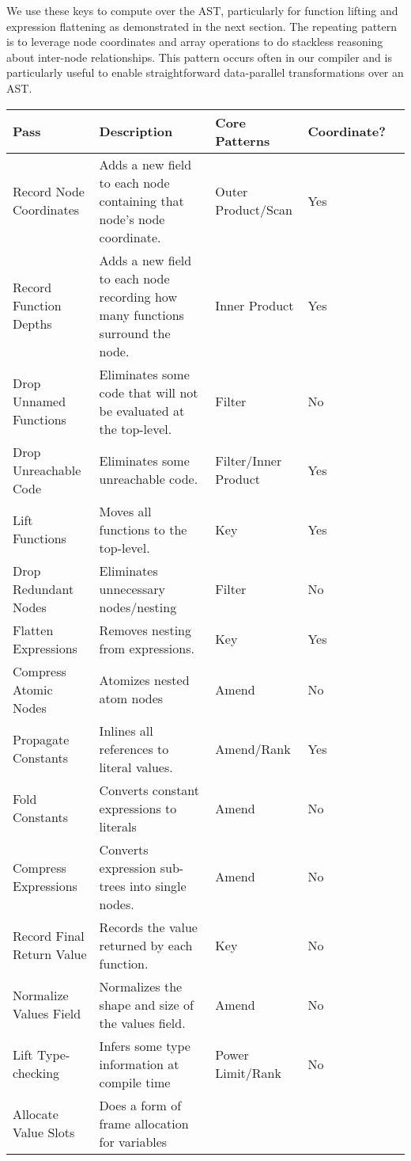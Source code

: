 \documentclass[numbers,preprint]{sigplanconf}
\begin{document}
\noindent
We use these keys to compute over the AST, particularly for function lifting 
and expression flattening as demonstrated in the next section. The repeating 
pattern is to leverage node coordinates and array operations to do stackless 
reasoning about inter-node relationships. This pattern occurs often in our 
compiler and is particularly useful to enable straightforward data-parallel 
transformations over an AST.

\begin{table*}
\centering
\begin{tabular}{l p{2.8in} l l l}
\toprule
Pass & Description & Core Patterns & Coordinate? \\
\midrule
Record Node Coordinates & Adds a new field to each node containing that node's 
 node coordinate. & Outer Product/Scan & Yes \\
Record Function Depths & Adds a new field to each node recording how many 
 functions surround the node. & Inner Product & Yes \\
Drop Unnamed Functions & Eliminates some code that will not be evaluated at 
 the top-level. & Filter & No \\
Drop Unreachable Code & Eliminates some unreachable code. &
 Filter/Inner Product & Yes \\
Lift Functions & Moves all functions to the top-level. & Key & Yes \\
Drop Redundant Nodes & Eliminates unnecessary nodes/nesting & Filter & No \\
Flatten Expressions & Removes nesting from expressions. & Key & Yes \\
Compress Atomic Nodes & Atomizes nested atom nodes & Amend & No \\
Propagate Constants & Inlines all references to literal values. &
 Amend/Rank & Yes \\
Fold Constants & Converts constant expressions to literals & Amend & No \\
Compress Expressions & Converts expression sub-trees into single nodes. & 
 Amend & No \\
Record Final Return Value & Records the value returned by each function. & 
 Key & No \\
Normalize Values Field & Normalizes the shape and size of the values field. &
 Amend & No \\
Lift Type-checking & Infers some type information at compile time &
 Power Limit/Rank & No \\
Allocate Value Slots & Does a form of frame allocation for variables &

\end{tabular}
\end{table*}
\end{document}
